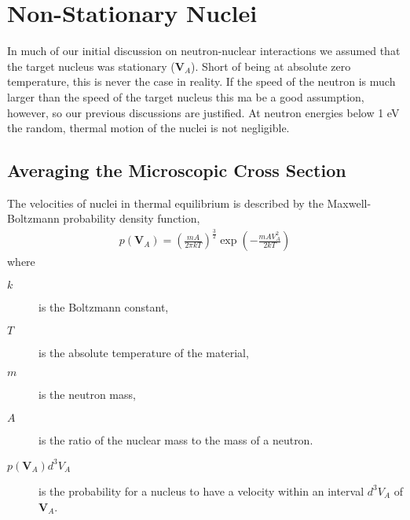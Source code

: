 \documentclass[11pt]{article}
\renewcommand\vec{\mathbf}
\begin{document}
\section{Non-Stationary Nuclei}
\label{sec:orgheadline9}
In much of our initial discussion on neutron-nuclear interactions we assumed that the target nucleus was stationary (\(\vec{V}_A\)).  Short of being at absolute zero temperature, this is never the case in reality.  If the speed of the neutron is much larger than the speed of the target nucleus this ma be a good assumption, however, so our previous discussions are justified.  At neutron energies below 1 eV the random, thermal motion of the nuclei is not negligible.

\subsection{Averaging the Microscopic Cross Section}
\label{sec:orgheadline6}
The velocities of nuclei in thermal equilibrium is described by the Maxwell-Boltzmann probability density function,
\begin{align}
  p(\vec{V}_A) = \left( \frac{mA}{2\pi k T} \right)^\frac{3}{2} \exp\left(-\frac{mAV_A^2}{2kT}\right) 
\end{align}
where
\begin{description}
\item[{\(k\)}] is the Boltzmann constant,
\item[{\(T\)}] is the absolute temperature of the material,
\item[{\(m\)}] is the neutron mass,
\item[{\(A\)}] is the ratio of the nuclear mass to the mass of a neutron.
\item[{\(p(\vec{V}_A)d^3V_A\)}] is the probability for a nucleus to have a velocity within an interval \(d^3V_A\) of \(\vec{V}_A\).
\end{description}
\end{document}
